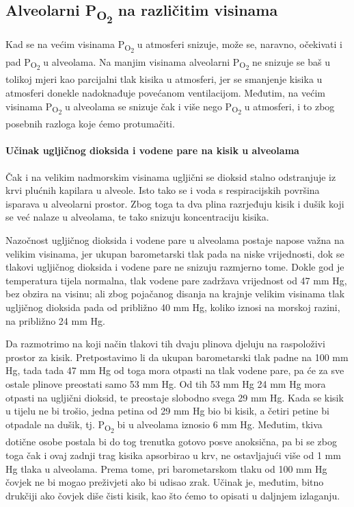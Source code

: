 \documentclass[12pt]{article}
\newcommand{\sub}[1]{\textsubscript{#1}}
\newcommand{\paro}{P\sub{O\sub{2}}}
\newcommand{\tl}{mm Hg}
\begin{document}
\subsection{Alveolarni \paro{} na različitim visinama}

Kad se na većim visinama \paro{} u atmosferi snizuje, može se, naravno,
očekivati i pad \paro{} u alveolama. Na manjim visinama alveolarni \paro{} ne
snizuje se baš u tolikoj mjeri kao parcijalni tlak kisika u atmosferi, jer se
smanjenje kisika u atmosferi donekle nadoknađuje povećanom ventilacijom.
Međutim, na većim visinama \paro{} u alveolama se snizuje čak i više nego \paro{} u
atmosferi, i to zbog posebnih razloga koje ćemo protumačiti.

\paragraph{Učinak ugljičnog dioksida i vodene pare na kisik u alveolama}
Čak i na velikim nadmorskim visinama ugljični se dioksid stalno odstranjuje iz
krvi plućnih kapilara u alveole. Isto tako se i voda s respiracijskih površina
isparava u alveolarni prostor. Zbog toga ta dva plina razrjeđuju kisik i dušik
koji se već nalaze u alveolama, te tako snizuju koncentraciju kisika.

Nazočnost ugljičnog dioksida i vodene pare u alveolama postaje napose važna na
velikim visinama, jer ukupan barometarski tlak pada na niske vrijednosti, dok se
tlakovi ugljičnog dioksida i vodene pare ne snizuju razmjerno tome. Dokle god je
temperatura tijela normalna, tlak vodene pare zadržava vrijednost od 47 \tl{},
bez obzira na visinu; ali zbog pojačanog disanja na krajnje velikim visinama
tlak ugljičnog dioksida pada od približno 40 \tl{}, koliko iznosi na morskoj
razini, na približno 24 \tl{}.

Da razmotrimo na koji način tlakovi tih dvaju plinova djeluju na raspoloživi
prostor za kisik. Pretpostavimo li da ukupan barometarski tlak padne na 100 \tl{},
tada tada 47 \tl{} od toga mora otpasti na tlak vodene pare, pa će za sve
ostale plinove preostati samo 53 \tl{}. Od tih 53 \tl{} 24 \tl{} mora otpasti na
ugljični dioksid, te preostaje slobodno svega 29 \tl{}. Kada se kisik u tijelu
ne bi trošio, jedna petina od 29 \tl{}  bio bi kisik, a četiri petine bi otpadale
na dušik, tj. \paro{} bi u alveolama iznosio 6 \tl{}. Međutim, tkiva dotične osobe
postala bi do tog trenutka gotovo posve anoksična, pa bi se zbog toga čak i ovaj
zadnji trag kisika apsorbirao u krv, ne ostavljajući više od 1 \tl{} tlaka u
alveolama. Prema tome, pri barometarskom tlaku od 100 \tl{} čovjek ne bi mogao
preživjeti ako bi udisao zrak. Učinak je, međutim, bitno drukčiji ako čovjek
diše čisti kisik, kao što ćemo to opisati u daljnjem izlaganju.
\end{document}
